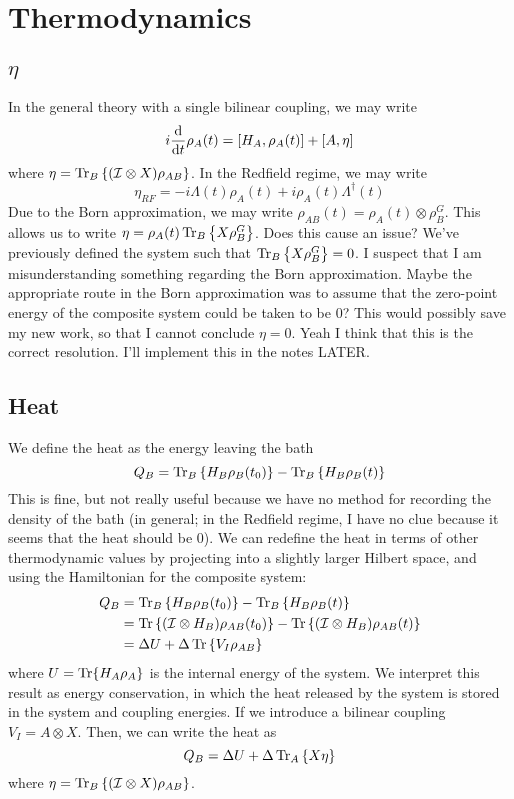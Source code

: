 \documentclass{article}
\newcommand{\ten}{\otimes}
\newcommand{\Tra}[1]{\Tr\left\{#1\right\}}
\newcommand{\Ptra}[2]{\Tr_{#1}\left\{#2\right\}}
\newcommand{\I}{\mathcal{I}}
\begin{document}
\section{Thermodynamics}

\subsection{$\eta$}

In the general theory with a single bilinear coupling, we may write
\begin{equation}
i\dv{t}\rho_A(t) = \comm{H_A}{\rho_A(t)} + \comm{A}{\eta}
\end{equation}
where $\eta = \Ptra{B}{(\I\ten X)\rho_{AB}}$. In the Redfield regime, we may write
\begin{equation}
\eta_{RF} = -i\Lambda(t)\rho_A(t) + i\rho_A(t)\Lambda^{\dag}(t)
\end{equation}
Due to the Born approximation, we may write $\rho_{AB}(t) = \rho_A(t)\ten\rho_B^G$. This allows us to write $\eta = \rho_A(t)\Ptra{B}{X\rho_B^G}$. Does this cause an issue? We've previously defined the system such that $\Ptra{B}{X\rho_B^G}=0$. I suspect that I am misunderstanding something regarding the Born approximation. Maybe the appropriate route in the Born approximation was to assume that the zero-point energy of the composite system could be taken to be $0$? This would possibly save my new work, so that I cannot conclude $\eta=0$. Yeah I think that this is the correct resolution. I'll implement this in the notes LATER.

\subsection{Heat}

We define the heat as the energy leaving the bath
\begin{equation}
    Q_B = \Ptra{B}{H_B\rho_B(t_0)} - \Ptra{B}{H_B\rho_B(t)}
\end{equation}
This is fine, but not really useful because we have no method for recording the density of the bath (in general; in the Redfield regime, I have no clue because it seems that the heat should be $0$). We can redefine the heat in terms of other thermodynamic values by projecting into a slightly larger Hilbert space, and using the Hamiltonian for the composite system:
\begin{align}
    Q_B &= \Ptra{B}{H_B\rho_B(t_0)} - \Ptra{B}{H_B\rho_B(t)}\\
    &= \Tra{(\I\ten H_B)\rho_{AB}(t_0)} - \Tra{(\I\ten H_B)\rho_{AB}(t)}\\
    &= \Delta U + \Delta\Tra{V_I\rho_{AB}}
\end{align}
where $U = \Tr{H_A\rho_A}$ is the internal energy of the system. We interpret this result as energy conservation, in which the heat released by the system is stored in the system and coupling energies. If we introduce a bilinear coupling $V_I = A\ten X$. Then, we can write the heat as
\begin{equation}
    Q_B = \Delta U + \Delta\Ptra{A}{X\eta}
\end{equation}
where $\eta = \Ptra{B}{(\I\ten X)\rho_{AB}}$.
\end{document}
